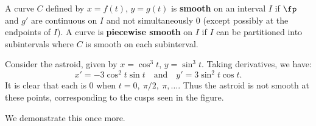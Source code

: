 
{A curve $C$ defined by $x=f(t)$, $y=g(t)$ is \textbf{smooth} on an interval $I$ if $\fp$ and $g'$ are continuous on $I$ and not simultaneously 0 (except possibly at the endpoints of $I$). A curve is \textbf{piecewise smooth} on $I$ if $I$ can be partitioned into subintervals where $C$ is smooth on each subinterval.
}

Consider the astroid, given by $x=\cos^3t$, $y=\sin^3t$. Taking derivatives, we have:
$$x' = -3\cos^2t\sin t\quad \text{and}\quad y' = 3\sin^2t\cos t.$$
It is clear that each is 0 when $t=0,\ \pi/2,\ \pi,\ldots$. Thus the astroid is not smooth at these points, corresponding to the cusps seen in the figure.


We demonstrate this once more.\\

